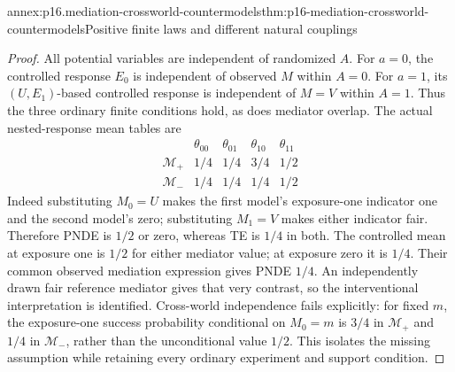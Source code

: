 \begin{annexitem}{annex:p16.mediation-crossworld-countermodels}{thm:p16-mediation-crossworld-countermodels}{Positive finite laws and different natural couplings}
\begin{proof}
All potential variables are independent of randomized \(A\). For
\(a=0\), the controlled response \(E_0\) is independent of observed
\(M\) within \(A=0\). For \(a=1\), its \((U,E_1)\)-based controlled
response is independent of \(M=V\) within \(A=1\). Thus the three
ordinary finite conditions hold, as does mediator overlap.
The actual nested-response mean tables are
\[
\begin{array}{c|cccc}
 &\theta_{00}&\theta_{01}&\theta_{10}&\theta_{11}\\\hline
 \mathcal M_+&1/4&1/4&3/4&1/2\\
 \mathcal M_-&1/4&1/4&1/4&1/2
\end{array}
\]
Indeed substituting \(M_0=U\) makes the first model's exposure-one
indicator one and the second model's zero; substituting \(M_1=V\)
makes either indicator fair. Therefore PNDE is \(1/2\) or zero,
whereas TE is \(1/4\) in both. The controlled mean at exposure one
is \(1/2\) for either mediator value; at exposure zero it is \(1/4\).
Their common observed mediation expression gives PNDE \(1/4\).
An independently drawn fair reference mediator gives that very contrast,
so the interventional interpretation is identified.
Cross-world independence fails explicitly: for fixed \(m\), the
exposure-one success probability conditional on \(M_0=m\) is \(3/4\)
in \(\mathcal M_+\) and \(1/4\) in \(\mathcal M_-\), rather than
the unconditional value \(1/2\). This isolates the missing assumption
while retaining every ordinary experiment and support condition.
\end{proof}
\end{annexitem}

